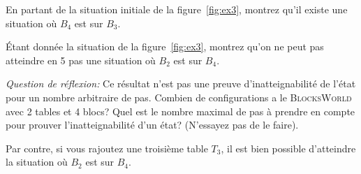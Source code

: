 \begin{exo}\label{ex:exp1}
En partant de la situation initiale de la figure~\ref{fig:ex3}, montrez qu'il existe une
  situation où $B_4$ est sur $B_3$.
  \end{exo}

\begin{exo}\label{ex:exp1_neg}
Étant donnée la situation de la figure~\ref{fig:ex3}, montrez qu'on ne peut pas
  atteindre en 5 pas une situation où $B_2$ est sur $B_4$. 
  \end{exo}

  \emph{Question de réflexion:} Ce résultat n'est pas une preuve
  d'inatteignabilité de l'état pour un nombre arbitraire de pas. Combien de
  configurations a le \textsc{BlocksWorld} avec 2 tables et 4 blocs? Quel est
  le nombre maximal de pas à prendre en compte pour prouver l'inatteignabilité
  d'un état? (N'essayez pas de le faire).

\begin{exo}\label{ex:exp2}
Par contre, si vous rajoutez une troisième table $T_3$, il est bien possible
  d'atteindre la situation où $B_2$ est sur $B_4$.
    \end{exo}


